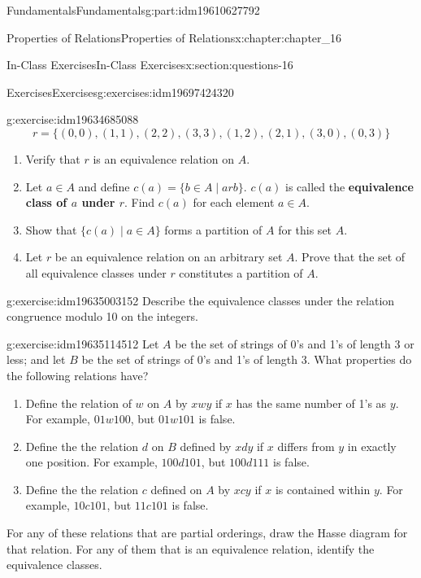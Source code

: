 \documentclass[oneside,10pt,]{book}
\newcommand{\terminology}[1]{\textbf{#1}}
\numberwithin{equation}{section}
\begin{document}
\begin{partptx}{Fundamentals}{}{Fundamentals}{}{}{g:part:idm19610627792}
\begin{chapterptx}{Properties of Relations}{}{Properties of Relations}{}{}{x:chapter:chapter_16}
\begin{sectionptx}{In-Class Exercises}{}{In-Class Exercises}{}{}{x:section:questions-16}
\begin{exercises-subsection-numberless}{Exercises}{}{Exercises}{}{}{g:exercises:idm19697424320}
\begin{exercisegroup}
\begin{divisionexerciseeg}{2}{}{}{g:exercise:idm19634685088}
\begin{equation*}
r = \{(0, 0), (1, 1), (2, 2), (3, 3), (1, 2), (2, 1), (3, 0), (0, 3)\}
\end{equation*}
%
\begin{enumerate}[label=(\alph*)]
\item{}Verify that \(r\) is an equivalence relation on \(A\).%
\item{}Let \(a \in A\) and define \(c(a) = \{b \in A \mid a rb\}\). \label{g:notation:idm19634618400} \(c(a)\) is called the \terminology{equivalence class of \(a\) under \(r\)}. Find \(c(a)\) for each element \(a \in A\).%
\item{}Show that \(\{c(a) \mid  a \in A\}\) forms a partition of \(A\) for this set \(A\).%
\item{}Let \(r\) be an equivalence relation on an arbitrary set \(A\). Prove that the set of all equivalence classes under \(r\) constitutes a partition of \(A\).%
\end{enumerate}
%
\end{divisionexerciseeg}%
\begin{divisionexerciseeg}{3}{}{}{g:exercise:idm19635003152}%
Describe the equivalence classes under the relation congruence modulo 10 on the integers.%
\end{divisionexerciseeg}%
\begin{divisionexerciseeg}{4}{}{}{g:exercise:idm19635114512}%
Let \(A\) be the set of strings of 0's and 1's of length 3 or less; and let \(B\) be the set of strings of 0's and 1's of length 3. What properties do the following relations have?%
\begin{enumerate}[label=(\alph*)]
\item{}Define the relation of \(w\) on \(A\) by \(x w y\) if \(x\) has the same number of 1's as \(y\). For example, \(01 w 100\), but \(01 w 101\) is false.%
\item{}Define the the relation \(d\)  on \(B\) defined by \(x d y\) if \(x\) differs from \(y\) in exactly one position. For example, \(100 d 101\), but \(100 d 111\) is false.%
\item{}Define the the relation \(c\) defined  on \(A\) by \(x c y\) if \(x\) is contained within \(y\). For example, \(10 c 101\), but \(11 c 101\) is false.%
\end{enumerate}
For any of these relations that are partial orderings, draw the Hasse diagram for that relation.  For any of them that is an equivalence relation, identify the equivalence classes.%
\end{divisionexerciseeg}%

\end{exercisegroup}
\end{exercises-subsection-numberless}
\end{sectionptx}
\end{chapterptx}
\end{partptx}
\end{document}
